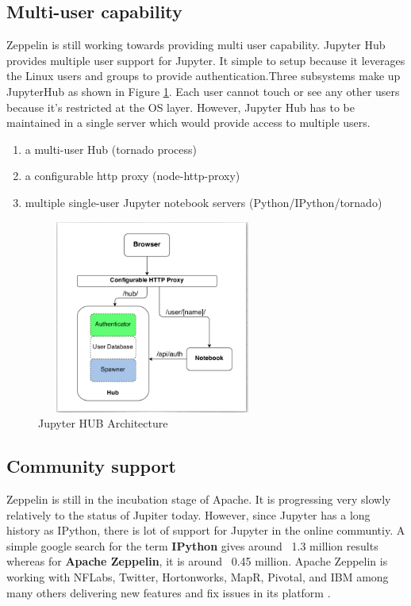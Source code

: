 \documentclass[9pt,twocolumn,twoside]{../../styles/osajnl}
\begin{document}
\subsection{Multi-user capability}
Zeppelin is still working towards providing multi user capability. Jupyter Hub \cite{www-jupyterhub} provides multiple user support for Jupyter. It simple to setup because it leverages the Linux users and groups to provide authentication.Three subsystems make up JupyterHub as shown in Figure \ref{fig:jhub}.
Each user cannot touch or see any other users because it's restricted at the OS layer. However, Jupyter Hub has to be maintained in a single server which would provide access to multiple users.
\begin{enumerate}
     \item a multi-user Hub (tornado process)
     \item a configurable http proxy (node-http-proxy)
     \item multiple single-user Jupyter notebook servers (Python/IPython/tornado) 
\end{enumerate}
\begin{figure}[h]
\begin{center}
\includegraphics[width =3in,height=2.5in]{images/jhub}
\caption{Jupyter HUB Architecture \cite{www-jupyterhub}}
\label{fig:jhub}
\end{center}
\end{figure}

\subsection{Community support}

Zeppelin is still in the incubation stage of Apache. It is progressing very slowly relatively to the status of Jupiter today. However, since Jupyter has a long history as IPython, there is lot of support for Jupyter in the online communtiy. A simple google search for the term \textbf{IPython} gives around ~1.3 million results whereas for \textbf{Apache Zeppelin}, it is around ~0.45 million. Apache Zeppelin is working with NFLabs, Twitter, Hortonworks, MapR, Pivotal, and IBM among many others delivering new features and fix issues in its platform \cite{www-horton-zeppelin}.
\end{document}
